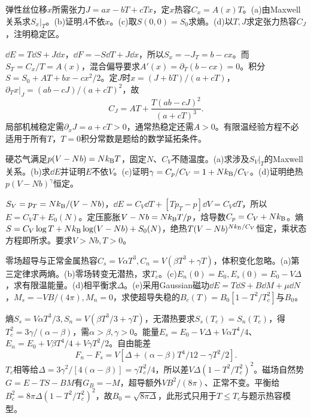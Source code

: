 \begin{exercise}[原题1(a)--(d)]\label{p:333-1-1}
弹性丝位移$x$所需张力$J=ax-bT+cTx$，定$x$热容$C_x=A(x)T$。(a)由Maxwell关系求$S_x|_T$。(b)证明$A$不依$x$。(c)取$S(0,0)=S_0$求熵。(d)以$T,J$求定张力热容$C_J$，注明稳定区。
\end{exercise}
\begin{solution}
$\dd E=T\dd S+J\dd x$，$\dd F=-S\dd T+J\dd x$，所以$S_x=-J_T=b-cx$。而$S_T=C_x/T=A(x)$，混合偏导要求$A'(x)=\partial_T(b-cx)=0$。积分$S=S_0+AT+bx-cx^2/2$。定$J$时$x=(J+bT)/(a+cT)$，$\partial_Tx|_J=(ab-cJ)/(a+cT)^2$，故
\begin{equation}
C_J=AT+\frac{T(ab-cJ)^2}{(a+cT)^3}.
\end{equation}
局部机械稳定需$\partial_xJ=a+cT>0$，通常热稳定还需$A>0$。有限温经验方程不必适用于所有$T$，$T=0$积分常数是题给的数学延拓条件。
\end{solution}
\begin{exercise}[原题2(a)--(d)]\label{p:333-1-2}
硬芯气满足$p(V-Nb)=Nk_{\mathrm B} T$，固定$N$、$C_V$不随温度。(a)求涉及$S_V|_T$的Maxwell关系。(b)求$\dd E$并证明$E$不依$V$。(c)证明$\gamma=C_p/C_V=1+Nk_{\mathrm B}/C_V$。(d)证明绝热$p(V-Nb)^\gamma$恒定。
\end{exercise}
\begin{solution}
$S_V=p_T=Nk_{\mathrm B}/(V-Nb)$，$\dd E=C_V\dd T+[Tp_T-p]\dd V=C_V\dd T$，所以$E=C_VT+E_0(N)$。定压膨胀$V-Nb=Nk_{\mathrm B} T/p$，焓导数$C_p=C_V+Nk_{\mathrm B}$。熵$S=C_V\log T+Nk_{\mathrm B}\log(V-Nb)+S_0(N)$，绝热$T(V-Nb)^{Nk_{\mathrm B}/C_V}$恒定，乘状态方程即所求。要求$V>Nb,T>0$。
\end{solution}
\begin{exercise}[原题3(a)--(e)]\label{p:333-1-3}
零场超导与正常金属热容$C_s=V\alpha T^3,C_n=V(\beta T^3+\gamma T)$，体积变化忽略。(a)第三定律求两熵。(b)零场转变无潜热，求$T_c$。(c)$E_n(0)=E_0,E_s(0)=E_0-V\Delta$，求有限温能量。(d)相平衡求$\Delta$。(e)采用Gaussian磁功$\dd E=T\dd S+B\dd M+\mu\dd N$，$M_s=-VB/(4\pi),M_n=0$，求使超导失稳的$B_c(T)=B_0[1-T^2/T_c^2]$与$B_0$。
\end{exercise}
\begin{solution}
熵$S_s=V\alpha T^3/3,S_n=V(\beta T^3/3+\gamma T)$，无潜热要求$S_s(T_c)=S_n(T_c)$，得$T_c^2=3\gamma/(\alpha-\beta)$，需$\alpha>\beta,\gamma>0$。能量$E_s=E_0-V\Delta+V\alpha T^4/4$、$E_n=E_0+V\beta T^4/4+V\gamma T^2/2$。自由能差
\begin{equation}
F_n-F_s=V[\Delta+(\alpha-\beta)T^4/12-\gamma T^2/2].
\end{equation}
$T_c$相等给$\Delta=3\gamma^2/[4(\alpha-\beta)]=\gamma T_c^2/4$，所以差$V\Delta(1-T^2/T_c^2)^2$。磁场自然势$G=E-TS-BM$有$G_B=-M$，超导额外$VB^2/(8\pi)$、正常不变。平衡给$B_c^2=8\pi\Delta(1-T^2/T_c^2)^2$，故$B_0=\sqrt{8\pi\Delta}$，此形式只用于$T\le T_c$与题示热容模型。
\end{solution}
